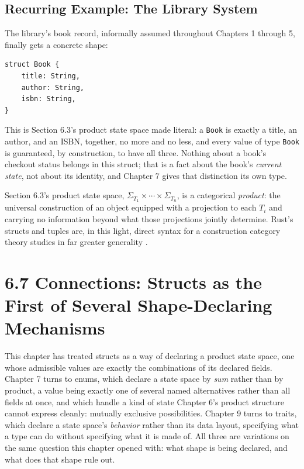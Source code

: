 \documentclass[11pt]{book}
\begin{document}
\subsection*{Recurring Example: The Library System}

The library's book record, informally assumed throughout Chapters 1 through 5, finally gets a concrete shape:

\begin{lstlisting}
struct Book {
    title: String,
    author: String,
    isbn: String,
}
\end{lstlisting}

This is Section 6.3's product state space made literal: a \texttt{Book} is exactly a title, an author, and an ISBN, together, no more and no less, and every value of type \texttt{Book} is guaranteed, by construction, to have all three. Nothing about a book's checkout status belongs in this struct; that is a fact about the book's \emph{current state}, not about its identity, and Chapter 7 gives that distinction its own type.

\begin{categorybox}
Section 6.3's product state space, $\Sigma_{T_1} \times \cdots \times \Sigma_{T_n}$, is a categorical \emph{product}: the universal construction of an object equipped with a projection to each $T_i$ and carrying no information beyond what those projections jointly determine. Rust's structs and tuples are, in this light, direct syntax for a construction category theory studies in far greater generality \cite{milewski2019}.
\end{categorybox}

\section*{6.7 Connections: Structs as the First of Several Shape-Declaring Mechanisms}

This chapter has treated structs as a way of declaring a product state space, one whose admissible values are exactly the combinations of its declared fields. Chapter 7 turns to enums, which declare a state space by \emph{sum} rather than by product, a value being exactly one of several named alternatives rather than all fields at once, and which handle a kind of state Chapter 6's product structure cannot express cleanly: mutually exclusive possibilities. Chapter 9 turns to traits, which declare a state space's \emph{behavior} rather than its data layout, specifying what a type can do without specifying what it is made of. All three are variations on the same question this chapter opened with: what shape is being declared, and what does that shape rule out.
\end{document}
